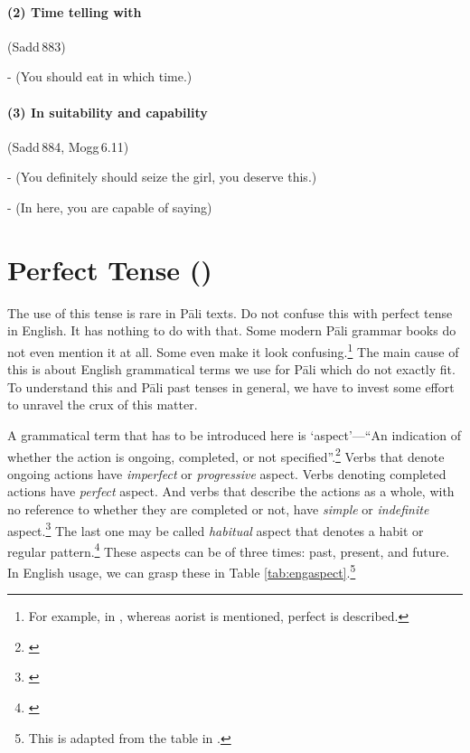 \paragraph*{(2) Time telling with } (Sadd\,883)\par
-  (You should eat in which time.)\par

\paragraph*{(3) In suitability and capability} (Sadd\,884, Mogg\,6.11)\par
-  (You definitely should seize the girl, you deserve this.)\par
-  (In here, you are capable of saying)\par

{}
\section*{Perfect Tense ()}

The use of this tense is rare in P\=ali texts. Do not confuse this with perfect tense in English. It has nothing to do with that. Some modern P\=ali grammar books do not even mention it at all. Some even make it look confusing.\footnote{For example, in \citealp[p.~80]{collins:grammar}, whereas aorist is mentioned, perfect  is described.} The main cause of this is about English grammatical terms we use for P\=ali which do not exactly fit. To understand this and P\=ali past tenses in general, we have to invest some effort to unravel the crux of this matter.

A grammatical term that has to be introduced here is `aspect'---``An indication of whether the action is ongoing, completed, or not specified''.\footnote{\citealp[p.~113]{fairbairn:understanding}} Verbs that denote ongoing actions have \emph{imperfect} or \emph{progressive} aspect. Verbs denoting completed actions have \emph{perfect} aspect. And verbs that describe the actions as a whole, with no reference to whether they are completed or not, have \emph{simple} or \emph{indefinite} aspect.\footnote{\citealp[p.~110]{fairbairn:understanding}} The last one may be called \emph{habitual} aspect that denotes a habit or regular pattern.\footnote{\citealp[p.~204]{brownmiller:dict}} These aspects can be of three times: past, present, and future. In English usage, we can grasp these in Table \ref{tab:engaspect}.\footnote{This is adapted from the table in \citealp[p.~118]{fairbairn:understanding}.}

